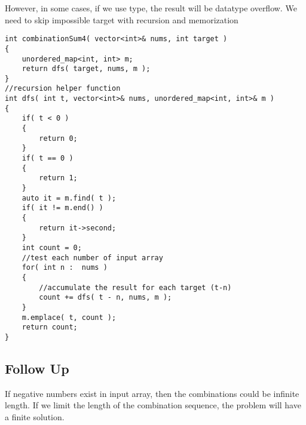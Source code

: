 However, in some cases, if we use  type, the result will be datatype overflow. We need to skip impossible target with recursion and memorization

\begin{lstlisting}[style=customc, caption={DP With Memo}]
int combinationSum4( vector<int>& nums, int target )
{
    unordered_map<int, int> m;
    return dfs( target, nums, m );
}
//recursion helper function
int dfs( int t, vector<int>& nums, unordered_map<int, int>& m )
{
    if( t < 0 )
    {
        return 0;
    }
    if( t == 0 )
    {
        return 1;
    }
    auto it = m.find( t );
    if( it != m.end() )
    {
        return it->second;
    }
    int count = 0;
    //test each number of input array
    for( int n :  nums )
    {
        //accumulate the result for each target (t-n)
        count += dfs( t - n, nums, m );
    }
    m.emplace( t, count );
    return count;
}
\end{lstlisting}
 
\subsection{Follow Up}
If negative numbers exist in input array, then the combinations could be infinite length. If we limit the length of the combination sequence, the problem will have a finite solution.
